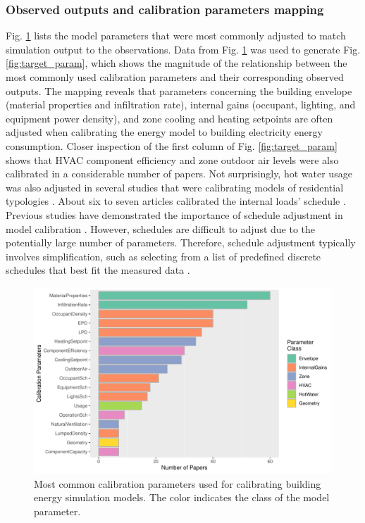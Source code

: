 \documentclass[review]{elsarticle}
\begin{document}
\subsubsection{Observed outputs and calibration parameters mapping} \label{sec:output_param}

Fig. \ref{fig:param} lists the model parameters that were most commonly adjusted to match simulation output to the observations. Data from Fig. \ref{fig:param} was used to generate Fig. \ref{fig:target_param}, which shows the magnitude of the relationship between the most commonly used calibration parameters and their corresponding observed outputs. The mapping reveals that parameters concerning the building envelope (material properties and infiltration rate), internal gains (occupant, lighting, and equipment power density), and zone cooling and heating setpoints are often adjusted when calibrating the energy model to building electricity energy consumption. Closer inspection of the first column of Fig. \ref{fig:target_param} shows that HVAC component efficiency and zone outdoor air levels were also calibrated in a considerable number of papers. Not surprisingly, hot water usage was also adjusted in several studies that were calibrating models of residential typologies \cite{nagpal2019methodology, sokol2017validation, robertson2015reduced, manfren2020parametric}. About six to seven articles calibrated the internal loads' schedule \cite{nagpal2019methodology, kim2017building, sun2016pattern, nagpal2019framework, asadi2019building, chen2020automatic, krayem2019urban}. Previous studies have demonstrated the importance of schedule adjustment in model calibration \cite{kim2017building, chong2021occupancy}. However, schedules are difficult to adjust due to the potentially large number of parameters. Therefore, schedule adjustment typically involves simplification, such as selecting from a list of predefined discrete schedules that best fit the measured data \cite{nagpal2019methodology, nagpal2019framework, krayem2019urban, chen2020automatic}. 

\begin{figure}[!h]
\centering
\includegraphics[width=\textwidth]{figures/param_rank.pdf}
\caption{Most common calibration parameters used for calibrating building energy simulation models. The color indicates the class of the model parameter.}
\label{fig:param}
\end{figure}
\end{document}
